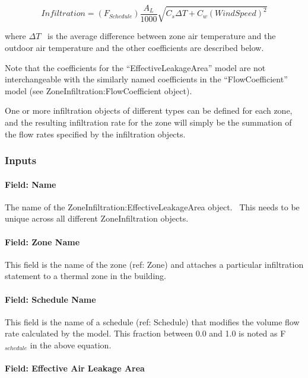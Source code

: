 \begin{equation}
Infiltration = \left( {{F_{Schedule}}} \right)\frac{{{A_L}}}{{1000}}\sqrt {{C_s}\Delta T + {C_w}{{\left( {WindSpeed} \right)}^2}}
\end{equation}

where \(\Delta T\) ~is the average difference between zone air temperature and the outdoor air temperature and the other coefficients are described below.

Note that the coefficients for the ``EffectiveLeakageArea'' model are not interchangeable with the similarly named coefficients in the ``FlowCoefficient'' model (see ZoneInfiltration:FlowCoefficient object).

One or more infiltration objects of different types can be defined for each zone, and the resulting infiltration rate for the zone will simply be the summation of the flow rates specified by the infiltration objects.

\subsubsection{Inputs}\label{inputs-1-005}

\paragraph{Field: Name}\label{field-name-1-004}

The name of the ZoneInfiltration:EffectiveLeakageArea object.~ This needs to be unique across all different ZoneInfiltration objects.

\paragraph{Field: Zone Name}\label{field-zone-name-002}

This field is the name of the zone (ref: Zone) and attaches a particular infiltration statement to a thermal zone in the building.

\paragraph{Field: Schedule Name}\label{field-schedule-name-1}

This field is the name of a schedule (ref: Schedule) that modifies the volume flow rate calculated by the model. This fraction between 0.0 and 1.0 is noted as F\(_{schedule}\) in the above equation.

\paragraph{Field: Effective Air Leakage Area}\label{field-effective-air-leakage-area}

